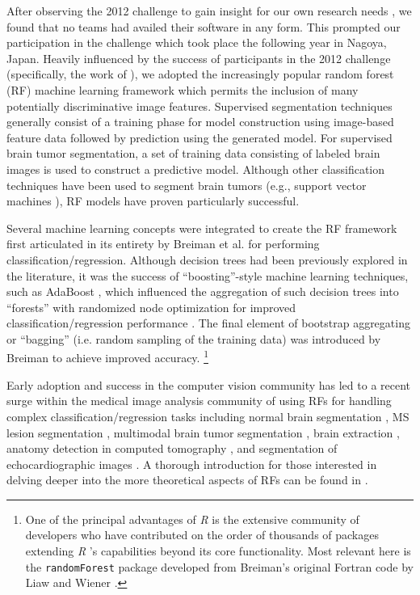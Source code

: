 \documentclass[preprint,authoryear,review,12pt]{elsarticle}
\begin{document}
After observing the 2012 challenge to gain insight for our own research 
needs \citep{durst2014}, we found that no teams had availed their software in any 
form.  This prompted our participation in the challenge which took place
the following year in Nagoya, Japan.  Heavily influenced by the success 
of participants in the 2012 challenge (specifically, the work of 
\cite{bauer2012,geremia2012,zikic2012}), we adopted the increasingly popular 
random forest (RF) machine learning framework \citep{breiman2001} which 
permits the inclusion of many potentially discriminative image features.  
Supervised segmentation techniques generally consist of a training phase
for model construction using image-based feature data followed by prediction using the 
generated model.  For supervised brain tumor segmentation, 
a set of training data consisting of labeled brain images 
is used to construct a predictive model.  Although other 
classification techniques have been used to segment
brain tumors (e.g., support vector machines \citep{bauer2011}),
RF models have proven particularly successful.

Several machine learning concepts were integrated to create 
the RF framework first articulated in its entirety by Breiman
et al. \citep{breiman2001} for performing classification/regression.  
Although decision trees had been previously explored in the literature, 
it was the success of ``boosting''-style machine learning 
techniques, such as AdaBoost \citep{schapire1990,freund1997}, which influenced 
the aggregation of such decision trees into ``forests'' 
with randomized node optimization for improved
classification/regression performance \citep{ho1995,amit1997}.
The final element of bootstrap aggregating or ``bagging'' (i.e.
random sampling of the training data) was
introduced by Breiman \citep{breiman1996} to achieve improved
accuracy.%
\footnote{
One of the principal advantages of \textit{R} is the extensive community of
developers  who have contributed on the order of thousands of packages 
extending \textit{R} 's capabilities beyond its core functionality.
Most relevant here
is the {\tt randomForest} package developed from Breiman's original
Fortran code by Liaw and Wiener \citep{liaw2002}.
}

Early adoption \cite{viola2005} and success in the
computer vision community
has led to a recent surge within the medical image analysis
community of using RFs for handling complex 
classification/regression tasks including
normal brain segmentation \citep{yi2009},
MS lesion segmentation \cite{geremia2011}, 
multimodal brain tumor segmentation
\citep{bauer2012,zikic2012}, brain extraction \citep{iglesias2010}, 
anatomy detection in computed tomography \citep{criminisi2013}, and
segmentation of echocardiographic images \citep{verhoek2011}. 
A thorough introduction for those interested in delving deeper 
into the more theoretical aspects of RFs can be found
in \cite{criminisi2011}.
\end{document}
